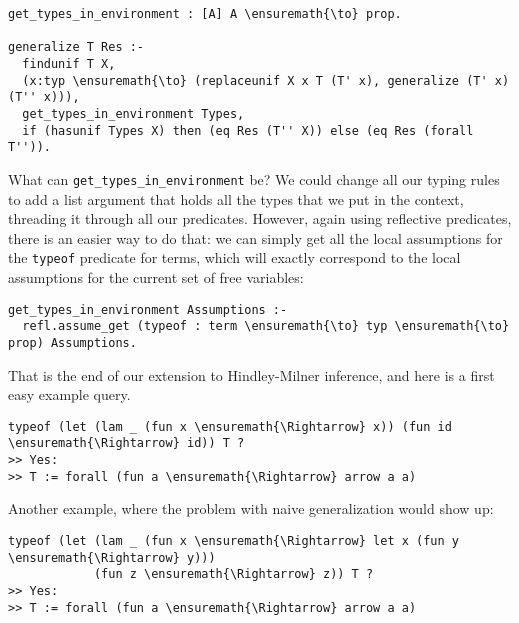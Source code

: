 \begin{verbatim}
get_types_in_environment : [A] A \ensuremath{\to} prop.

generalize T Res :-
  findunif T X,
  (x:typ \ensuremath{\to} (replaceunif X x T (T' x), generalize (T' x) (T'' x))),
  get_types_in_environment Types,
  if (hasunif Types X) then (eq Res (T'' X)) else (eq Res (forall T'')).
\end{verbatim}

What can \texttt{get\_types\_in\_environment} be? We could change all
our typing rules to add a list argument that holds all the types that we
put in the context, threading it through all our predicates. However,
again using reflective predicates, there is an easier way to do that: we
can simply get all the local assumptions for the \texttt{typeof}
predicate for terms, which will exactly correspond to the local
assumptions for the current set of free variables:

\begin{verbatim}
get_types_in_environment Assumptions :-
  refl.assume_get (typeof : term \ensuremath{\to} typ \ensuremath{\to} prop) Assumptions.
\end{verbatim}

That is the end of our extension to Hindley-Milner inference, and here
is a first easy example query.

\begin{verbatim}
typeof (let (lam _ (fun x \ensuremath{\Rightarrow} x)) (fun id \ensuremath{\Rightarrow} id)) T ?
>> Yes:
>> T := forall (fun a \ensuremath{\Rightarrow} arrow a a)
\end{verbatim}

Another example, where the problem with naive generalization would show
up:

\begin{verbatim}
typeof (let (lam _ (fun x \ensuremath{\Rightarrow} let x (fun y \ensuremath{\Rightarrow} y)))
            (fun z \ensuremath{\Rightarrow} z)) T ?
>> Yes:
>> T := forall (fun a \ensuremath{\Rightarrow} arrow a a)
\end{verbatim}
